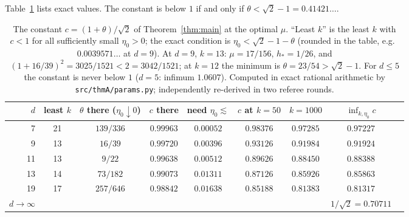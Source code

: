 \documentclass[11pt]{amsart}
\theoremstyle{definition}
\begin{document}
Table~\ref{tab:constants} lists exact values. The constant is below $1$ if and only if $\theta<\sqrt2-1=0.41421\ldots$.

\begin{table}[ht]
\centering\small
\begin{tabular}{@{}rcccccccc@{}}
\toprule
$d$ & least $k$ & $\theta$ there ($\eta_0\downarrow0$) & $c$ there & need $\eta_0\lesssim$ & $c$ at $k=50$ & $k=1000$ & $\inf_{k,\eta_0}c$\\
\midrule
7  & 21 & $139/336$ & $0.99963$ & $0.00052$ & $0.98376$ & $0.97285$ & $0.97227$\\
9  & 13 & $16/39$   & $0.99720$ & $0.00396$ & $0.93126$ & $0.91984$ & $0.91924$\\
11 & 13 & $9/22$    & $0.99638$ & $0.00512$ & $0.89626$ & $0.88450$ & $0.88388$\\
13 & 14 & $73/182$  & $0.99073$ & $0.01311$ & $0.87126$ & $0.85926$ & $0.85863$\\
19 & 17 & $257/646$ & $0.98842$ & $0.01638$ & $0.85188$ & $0.81383$ & $0.81317$\\
\midrule
$d\to\infty$ & & & & & & & $1/\sqrt2=0.70711$\\
\bottomrule
\end{tabular}
\medskip
\caption{The constant $c=(1+\theta)/\sqrt2$ of Theorem~\ref{thm:main} at the optimal $\mu$. ``Least $k$''
is the least $k$ with $c<1$ for all sufficiently small $\eta_0>0$; the exact condition is $\eta_0<\sqrt2-1-\theta$ (rounded in the table, e.g.\ $0.0039571\ldots$ at $d=9$). At $d=9$, $k=13$: $\mu=17/156$,
$h_*=1/26$, and $(1+16/39)^2=3025/1521<2=3042/1521$; at $k=12$ the minimum is $\theta=23/54>\sqrt2-1$.
For $d\le5$ the constant is never below $1$ ($d=5$: infimum $1.0607$). Computed in exact rational
arithmetic by \texttt{src/thmA/params.py}; independently re-derived in two referee rounds.}
\label{tab:constants}
\end{table}
\end{document}
